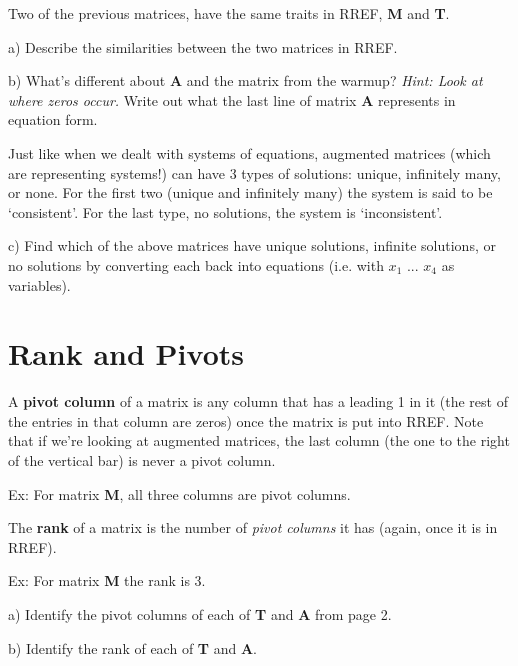 \documentclass{article}
\begin{document}
\begin{flushleft}
Two of the previous matrices, have the same traits in RREF, \textbf{M} and \textbf{T}.\\

\vspace{0.2in}

a) Describe the similarities between the two matrices in RREF.

\vspace{1.5in}

b) What's different about \textbf{A} and the matrix from the warmup?  \textit{Hint: Look at where zeros occur.}  Write out what the last line of matrix \textbf{A} represents in equation form.

\vspace{1.5in}

Just like when we dealt with systems of equations, augmented matrices (which are representing systems!) can have 3 types of solutions:  unique, infinitely many, or none.  For the first two (unique and infinitely many) the system is said to be `consistent'.  For the last type, no solutions, the system is `inconsistent'.

\vspace{0.2in}

c) Find which of the above matrices have unique solutions, infinite solutions, or no solutions by converting each back into equations (i.e. with $x_1$ ... $x_4$ as variables).

\newpage

\section{Rank and Pivots}

A \textbf{pivot column} of a matrix is any column that has a leading 1 in it (the rest of the entries in that column are zeros) once the matrix is put into RREF.  Note that if we're looking at augmented matrices, the last column (the one to the right of the vertical bar) is never a pivot column.

\vspace{0.2in}

Ex: For matrix \textbf{M}, all three columns are pivot columns.

\vspace{0.2in}

The \textbf{rank} of a matrix is the number of \textit{pivot columns} it has (again, once it is in RREF).

\vspace{0.2in}

Ex: For matrix \textbf{M} the rank is 3.

\vspace{0.2in}

a) Identify the pivot columns of each of \textbf{T} and \textbf{A} from page 2.

\vspace{2in}

b) Identify the rank of each of \textbf{T} and \textbf{A}.


\end{flushleft}
\end{document}
